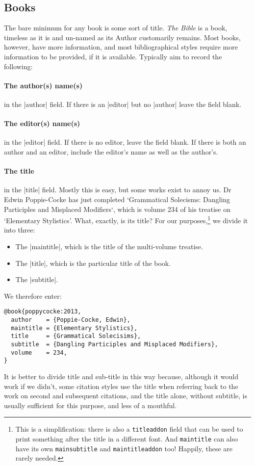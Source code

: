 \subsection{Books}

The bare minimum for any book is some sort of title. \emph{The Bible}
is a book, timeless as it is and un-named as its Author customarily
remains. Most books, however, have more information, and most
bibliographical styles require more information to be provided, if it
is available. Typically aim to record the following:

\paragraph{The author(s) name(s)} in the |author| field. If there is
an |editor| but no |author| leave the field blank.

\paragraph{The editor(s) name(s)} in the |editor| field. If there is
no editor, leave the field blank. If there is both an author and an
editor, include the editor's name as well as the author's.

\paragraph{The title} in the |title| field. Mostly this is easy, but
some works exist to annoy us. Dr Edwin Poppie-Cocke has just completed
`Grammatical Solecisms: Dangling Participles and Misplaced Modifiers`,
which is volume 234 of his treatise on `Elementary Stylistics'. What,
exactly, is its title? For our purposes,\footnote{This is a
  simplification: there is also a \texttt{titleaddon} field that can
  be used to print something after the title in a different font. And
  \texttt{maintitle} can also have its own \texttt{mainsubtitle} and
  \texttt{maintitleaddon} too! Happily, these are rarely needed.} we
divide it into three:
\begin{itemize}
\item The |maintitle|, which is the title of the multi-volume
  treatise.
\item The |title|, which is the particular title of the book.
\item The |subtitle|.
\end{itemize}
We therefore enter:
\begin{Verbatim}
@book{poppycocke:2013,
  author    = {Poppie-Cocke, Edwin},
  maintitle = {Elementary Stylistics},
  title     = {Grammatical Solecisims},
  subtitle  = {Dangling Participles and Misplaced Modifiers},
  volume    = 234,
}
\end{Verbatim}
It is better to divide title and sub-title in this way because,
although it would work if we didn't, some citation styles use the
title when referring back to the work on second and subsequent
citations, and the title alone, without subtitle, is usually
sufficient for this purpose, and less of a mouthful.

